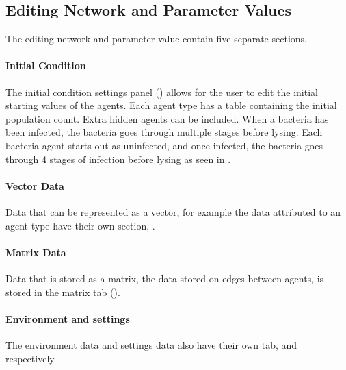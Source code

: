 \subsection{Editing Network and Parameter Values}
\label{sec:editing_network_and_parameter_values}
The editing network and parameter value contain five separate sections.
\paragraph{Initial Condition}
The initial condition settings panel () allows for the user to edit the initial starting values of the agents. 
Each agent type has a table containing the initial population count. 
Extra hidden agents can be included. 
When a bacteria has been infected, the bacteria goes through multiple stages before lysing. Each bacteria agent starts out as uninfected, and once infected, the bacteria goes through 4 stages of infection before lysing as seen in . \newline 
\paragraph{Vector Data} 
Data that can be represented as a vector, for example the data attributed to an agent type have their own section, .
\paragraph{Matrix Data}
Data that is stored as a matrix, the data stored on edges between agents, is stored in the matrix tab ().
\paragraph{Environment and settings}
The environment data and settings data also have their own tab,  and  respectively.

